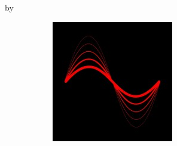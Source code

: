 \begin{titlepage}
        
        \vspace*{\fill}

        \begin{center}
            \makeatletter


            \LARGE
            \textbf{\@title}
            \smallskip

            \textnormal{by}

            \smallskip
            \textsl{\@author}
            \makeatother
        \end{center}
        

        \begin{figure}[!h]
            \centering
            \begin{subfigure}[b]{0.3\textwidth}
                \includegraphics[width=\textwidth]{assets/hlabs_logo}
            \end{subfigure}
        \end{figure}

        \vspace*{\fill}

    \restoregeometry
\end{titlepage}
